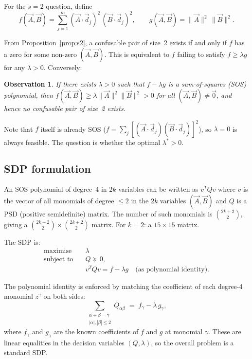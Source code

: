 \documentclass[12pt,a4paper]{article}
\newtheorem{observation}{Observation}
\begin{document}
For the $s = 2$ question, define
\[
  f(\vec{A}, \vec{B})
  = \sum_{j=1}^m (\vec{A} \cdot \vec{d}_j)^2\,(\vec{B} \cdot \vec{d}_j)^2,
  \qquad
  g(\vec{A}, \vec{B}) = \|\vec{A}\|^2\,\|\vec{B}\|^2.
\]

From Proposition~\ref{prop:s2}, a confusable pair of size~2 exists if
and only if $f$ has a zero for some non-zero $(\vec{A}, \vec{B})$.  This
is equivalent to $f$ failing to satisfy $f \geq \lambda g$ for any
$\lambda > 0$.  Conversely:

\begin{observation}
  If there exists $\lambda > 0$ such that $f - \lambda g$ is a
  sum-of-squares (SOS) polynomial, then $f(\vec{A}, \vec{B}) \geq
  \lambda \|\vec{A}\|^2 \|\vec{B}\|^2 > 0$ for all $(\vec{A}, \vec{B})
  \neq \vec{0}$, and hence no confusable pair of size~2 exists.
\end{observation}

Note that $f$ itself is already SOS ($f = \sum_j [(\vec{A} \cdot
\vec{d}_j)(\vec{B} \cdot \vec{d}_j)]^2$), so $\lambda = 0$ is always
feasible.  The question is whether the optimal $\lambda^* > 0$.

\subsection*{SDP formulation}

An SOS polynomial of degree~4 in $2k$ variables can be written as
$v^T Q v$ where $v$ is the vector of all monomials of degree $\leq 2$ in
the $2k$ variables $(\vec{A}, \vec{B})$ and $Q$ is a PSD (positive
semidefinite) matrix.  The number of such monomials is $\binom{2k +
2}{2}$, giving a $\binom{2k+2}{2} \times \binom{2k+2}{2}$ matrix.  For
$k = 2$: a $15 \times 15$ matrix.

The SDP is:
\begin{align*}
  \text{maximise} \quad & \lambda \\
  \text{subject to} \quad
    & Q \succeq 0, \\
    & v^T Q v = f - \lambda g \quad\text{(as polynomial identity).}
\end{align*}

The polynomial identity is enforced by matching the coefficient of each
degree-4 monomial $z^\gamma$ on both sides:
\[
  \sum_{\substack{\alpha + \beta = \gamma \\ |\alpha|, |\beta| \leq 2}}
  Q_{\alpha\beta}
  \;=\;
  f_\gamma - \lambda\, g_\gamma,
\]
where $f_\gamma$ and $g_\gamma$ are the known coefficients of $f$ and
$g$ at monomial $\gamma$.  These are linear equalities in the decision
variables $(Q, \lambda)$, so the overall problem is a standard SDP.
\end{document}
